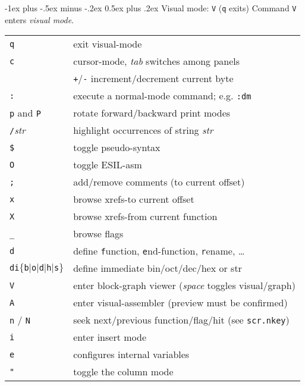 \documentclass[a4paper,landscape]{article}
\makeatletter
\renewcommand{\section}{\@startsection{section}{1}{0mm}%
                                {-1ex plus -.5ex minus -.2ex}%
                                {0.5ex plus .2ex}%
                                {\normalfont\large\bfseries}}
\makeatother
\begin{document}
\begin{multicols*}{3}
\section{Visual mode: \texttt{V} (\texttt{q} exits)}
Command \texttt{V} enters \emph{visual mode}.

\begin{tabular}{@{}ll@{}}
\texttt{q} & exit visual-mode \\
\texttt{c} & cursor-mode, \textit{tab} switches among panels \\
& \texttt{+}/\texttt{-} increment/decrement current byte \\
\texttt{:} & execute a normal-mode command; e.g. \texttt{:dm} \\
\texttt{p} and \texttt{P} & rotate forward/backward print modes \\
\texttt{/}\textit{str} & highlight occurrences of string \textit{str} \\
\texttt{\$} & toggle pseudo-syntax \\
\texttt{O} & toggle ESIL-asm \\
\texttt{;} & add/remove comments (to current offset) \\
\texttt{x} & browse xrefs-to current offset \\
\texttt{X} & browse xrefs-from current function \\
\texttt{\_} & browse flags \\
\texttt{d} & define \texttt{f}unction, \texttt{e}nd-function, \texttt{r}ename, \ldots \\
\texttt{di}$\{$\texttt{b}$|$\texttt{o}$|$\texttt{d}$|$\texttt{h}$|$\texttt{s}$\}$ & define immediate bin/oct/dec/hex or str \\
\texttt{V} & enter block-graph viewer (\emph{space} toggles visual/graph)\\
\texttt{A} & enter visual-assembler (preview must be confirmed)\\
\texttt{n} / \texttt{N} & seek next/previous function/flag/hit (see \texttt{scr.nkey}) \\
\texttt{i} & enter insert mode \\
\texttt{e} & configures internal variables \\
\texttt{"} & toggle the column mode \\
\end{tabular}

\end{multicols*}
\end{document}
